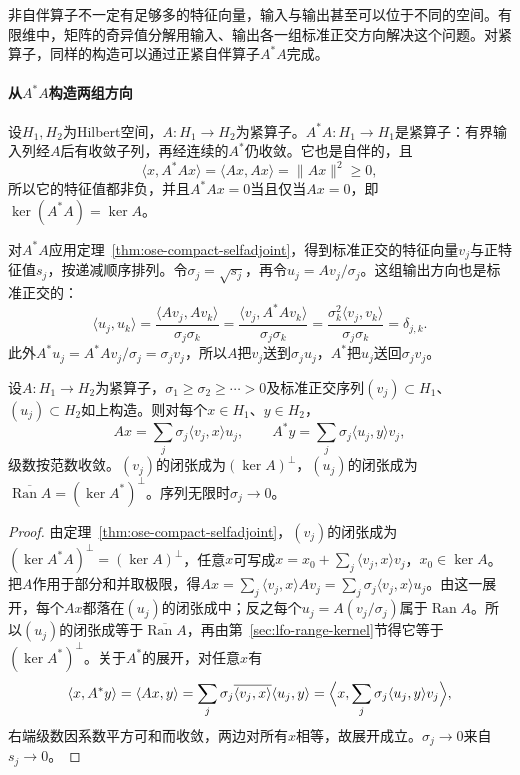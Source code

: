 非自伴算子不一定有足够多的特征向量，输入与输出甚至可以位于不同的空间。有限维中，矩阵的奇异值分解用输入、输出各一组标准正交方向解决这个问题。对紧算子，同样的构造可以通过正紧自伴算子$A^*A$完成。

\paragraph{从$A^*A$构造两组方向}
设$H_1,H_2$为Hilbert空间，$A:H_1\to H_2$为紧算子。$A^*A:H_1\to H_1$是紧算子：有界输入列经$A$后有收敛子列，再经连续的$A^*$仍收敛。它也是自伴的，且
\[
  \langle x,A^*Ax\rangle=\langle Ax,Ax\rangle=\|Ax\|^2\geq0 ,
\]
所以它的特征值都非负，并且$A^*Ax=0$当且仅当$Ax=0$，即$\ker(A^*A)=\ker A$。

对$A^*A$应用定理~\ref{thm:ose-compact-selfadjoint}，得到标准正交的特征向量$v_j$与正特征值$s_j$，按递减顺序排列。令$\sigma_j=\sqrt{s_j}$，再令$u_j=Av_j/\sigma_j$。这组输出方向也是标准正交的：
\[
  \langle u_j,u_k\rangle=\frac{\langle Av_j,Av_k\rangle}{\sigma_j\sigma_k}=\frac{\langle v_j,A^*Av_k\rangle}{\sigma_j\sigma_k}=\frac{\sigma_k^2\langle v_j,v_k\rangle}{\sigma_j\sigma_k}=\delta_{j,k} .
\]
此外$A^*u_j=A^*Av_j/\sigma_j=\sigma_jv_j$，所以$A$把$v_j$送到$\sigma_ju_j$，$A^*$把$u_j$送回$\sigma_jv_j$。

\begin{theorem}[紧算子的奇异值分解]
\label{thm:ose-svd}
设$A:H_1\to H_2$为紧算子，$\sigma_1\geq\sigma_2\geq\cdots>0$及标准正交序列$(v_j)\subset H_1$、$(u_j)\subset H_2$如上构造。则对每个$x\in H_1$、$y\in H_2$，
\begin{equation}
  Ax=\sum_j\sigma_j\langle v_j,x\rangle u_j,\qquad A^*y=\sum_j\sigma_j\langle u_j,y\rangle v_j ,
  \label{eq:ose-svd}
\end{equation}
级数按范数收敛。$(v_j)$的闭张成为$(\ker A)^\perp$，$(u_j)$的闭张成为$\overline{\operatorname{Ran}A}=(\ker A^*)^\perp$。序列无限时$\sigma_j\to0$。
\end{theorem}

\begin{proof}
由定理~\ref{thm:ose-compact-selfadjoint}，$(v_j)$的闭张成为$(\ker A^*A)^\perp=(\ker A)^\perp$，任意$x$可写成$x=x_0+\sum_j\langle v_j,x\rangle v_j$，$x_0\in\ker A$。把$A$作用于部分和并取极限，得$Ax=\sum_j\langle v_j,x\rangle Av_j=\sum_j\sigma_j\langle v_j,x\rangle u_j$。由这一展开，每个$Ax$都落在$(u_j)$的闭张成中；反之每个$u_j=A(v_j/\sigma_j)$属于$\operatorname{Ran}A$。所以$(u_j)$的闭张成等于$\overline{\operatorname{Ran}A}$，再由第~\ref{sec:lfo-range-kernel}节得它等于$(\ker A^*)^\perp$。关于$A^*$的展开，对任意$x$有
\[
  \langle x,A^*y\rangle=\langle Ax,y\rangle=\sum_j\sigma_j\overline{\langle v_j,x\rangle}\langle u_j,y\rangle=\Bigl\langle x,\sum_j\sigma_j\langle u_j,y\rangle v_j\Bigr\rangle ,
\]
右端级数因系数平方可和而收敛，两边对所有$x$相等，故展开成立。$\sigma_j\to0$来自$s_j\to0$。
\end{proof}

